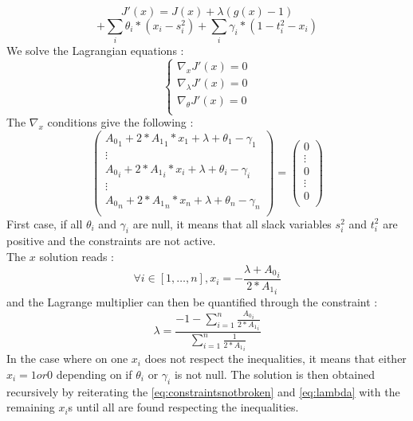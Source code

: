 \documentclass[conference]{IEEEtran}
\begin{document}
$$
J'(x)=J(x) + \lambda \left( g(x) - 1\right)
$$
$$
+\sum_i \theta_i*(x_i- s_i^2)+\sum_i \gamma_i*(1-t_i^2-x_i)
$$
We solve the Lagrangian equations :
\begin{equation}
\left\{
\begin{array}{ll}
  \nabla_x J'(x) = 0\\
  \nabla_\lambda J'(x)= 0 \\
  \nabla_\theta J'(x)= 0 \\
\end{array}
\right.
\end{equation}
The $\nabla_x$ conditions give the following :
$$
\begin{pmatrix} 
	{A_0}_1 + 2*{A_1}_1 * x_1  + \lambda + \theta_1 -\gamma_1\\
	\vdots\\
	{A_0}_i + 2*{A_1}_i * x_i  + \lambda + \theta_i-\gamma_i\\
	\vdots\\
	{A_0}_n + 2*{A_1}_n * x_n  + \lambda + \theta_n-\gamma_n\\
\end{pmatrix} 
=
\begin{pmatrix} 
	0 \\
	\vdots\\
	0 \\
	\vdots\\
	0 \\
	\end{pmatrix} 
$$
First case, if all $\theta_i$ and $\gamma_i$ are null, it means that all slack variables $s_i^2$ and $t_i^2$ are positive and the constraints are not active.\\
The $x$ solution reads :
\begin{equation}\label{eq:constraintsnotbroken}
\forall i \in \left[1,\ldots,n\right], x_i = -\frac{\lambda + {A_0}_i}{2*{A_1}_i}
\end{equation}
and the Lagrange multiplier can then be quantified through the constraint :
\begin{equation}\label{eq:lambda}
\lambda =\frac{-1 -\sum_{i=1}^{n} \frac{{A_0}_i}{2*{A_1}_i}} {\sum_{i=1}^{n} \frac{1}{2*{A_1}_i}}
\end{equation}
In the case where on one $x_i$ does not respect the inequalities, it means that either 
$x_i = 1 or 0$ depending on if $\theta_i$ or $\gamma_i$ is not null.
The solution is then obtained recursively by reiterating the \ref{eq:constraintsnotbroken} and \ref{eq:lambda} with the remaining $x_i$s until all are found respecting the inequalities.
\end{document}
